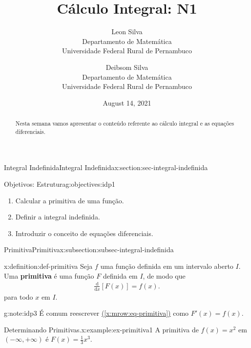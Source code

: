 \documentclass[oneside,10pt,]{article}
\title{Cálculo Integral: N1}
\author{Leon Silva\\
Departamento de Matemática\\
Universidade Federal Rural de Pernambuco
\and
Deibsom Silva\\
Departamento de Matemática\\
Universidade Federal Rural de Pernambuco
}
\date{August 14, 2021}
\newcommand{\xreffont}{\relax}
\newcommand{\terminology}[1]{\textbf{#1}}
\numberwithin{equation}{section}
\newcommand{\dd}{\mathrm{d}}
\begin{document}
\hypertarget{x:article:integral}{}
\maketitle
\thispagestyle{empty}
\begin{abstract}
Nesta semana vamos apresentar o conteúdo referente ao cálculo integral e as equações diferenciais.%
\end{abstract}
%
%
\typeout{************************************************}
\typeout{************************************************}
%
\begin{sectionptx}{Integral Indefinida}{}{Integral Indefinida}{}{}{x:section:sec-integral-indefinida}
\begin{objectives}{Objetivos: Estrutura}{g:objectives:idp1}
%
\begin{enumerate}
\item{}Calcular a primitiva de uma função.%
\item{}Definir a integral indefinida.%
\item{}Introduzir o conceito de equações diferenciais.%
\end{enumerate}
\end{objectives}
%
%
\typeout{************************************************}
\typeout{************************************************}
%
\begin{subsectionptx}{Primitiva}{}{Primitiva}{}{}{x:subsection:subsec-integral-indefinida}
\begin{definition}{}{x:definition:def-primitiva}%
Seja \(f\) uma função definida em um intervalo aberto\footnotemark{} \(I\). Uma \terminology{primitiva} é uma função \(F\) definida em \(I\), de modo que%
\begin{gather}
\frac{\dd}{\dd x}\left[F(x)\right]=f(x). \label{x:mrow:eq-primitiva}
\end{gather}
para todo \(x\) em \(I\).%
\end{definition}
%
\begin{note}{}{g:note:idp3}%
É comum reescrever \hyperref[x:mrow:eq-primitiva]{({\xreffont\ref{x:mrow:eq-primitiva}})} como \(F'(x)=f(x)\).%
\end{note}
\begin{example}{Determinando Primitivas.}{x:example:ex-primitiva1}%
A primitiva de \(f(x)=x^2\) em \((-\infty, +\infty)\) é \(F(x)=\frac{1}{3}x^3\).%

\end{example}
\end{subsectionptx}
\end{sectionptx}
\end{document}
